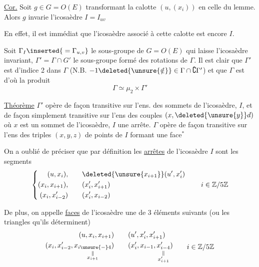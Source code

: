\uline{Cor.} Soit  $g\in G=O(E)$ transformant la calotte $(u,(x_i))$ en celle du lemme. Alors $g$ invarie l'icosaèdre $I=I_{uv}$

En effet, il est immédiat que l'icosaèdre associé à cette  calotte est encore $I$.

Soit $\Gamma_I\inserted{{}=\Gamma_{u,v}}$ le sous-groupe de $G=O(E)$ qui laisse l'icosaèdre  invariant, $\Gamma'=\Gamma\cap G'$ le sous-groupe formé des rotations de $\Gamma$. Il est clair que $\Gamma'$ est d'indice 2 dans $\Gamma$ (N.B. $-1\deleted{\unsure{\notin}}\in\Gamma\cap\complement\Gamma'$) et que $\Gamma$ est d'où la produit
\[
\Gamma\simeq\mu_2\times\Gamma'
\]

\uline{Théorème} $\Gamma'$ opère de façon transitive sur l'ens. des sommets de l'icosaèdre, $I$, et de façon simplement transitive sur l'ens des couples $(x,\deleted{\unsure{y}}d)$ où $x$ est un sommet de l'icosaèdre, $I$ une arrête. $\Gamma$ opère de façon  transitive sur l'ens des triples $(x,y,z)$ de points de $I$ formant une face$^{*}$

On a oublié de préciser que par définition les \uline{arrêtes} de l'icosaèdre $I$ sont les  segments  
\[
\left\{\begin{aligned}
(u,x_i),&\qquad \deleted{\unsure{x_{i+1}}}(u',x'_i)\\
(x_i,x_{i+1}),&\qquad (x'_i,x'_{i+1})\\
(x_i,x'_{i-2})&\qquad (x'_i,x_{i-2})
\end{aligned}\right.\qquad i\in\mathbb Z/5\mathbb Z
\]

De plus, on appelle \uline{faces} de l'icosaèdre une   de $3$   éléments  suivants (ou les triangles qu'ils déterminent)
\[
\begin{aligned}
(u,x_i,x_{i+1})&\qquad (u',x'_i,x'_{i+1})\\
(x_i,x'_{i-2},\underset{\substack{\Vert\\x_{i+1}}}{x_{i\unsure{-}4}})&\qquad
(x'_i,x_{i-1},\underset{\substack{\Vert\\x'_{i+1}}}{x'_{i-4}})
\end{aligned}\qquad i\in\mathbb Z/5\mathbb Z
\]

